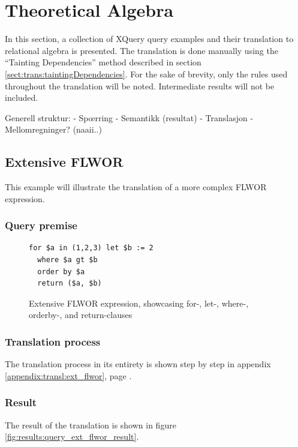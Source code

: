\section{Theoretical Algebra}
\label{sect:result:theoretical_algebra}
In this section, a collection of XQuery query examples and their translation to
relational algebra is presented. The translation is done manually using the
``Tainting Dependencies'' method described in section
\ref{sect:trans:taintingDependencies}. For the sake of brevity, only the
rules used throughout the translation will be noted. Intermediate results will
not be included.

Generell struktur:
- Sp\oe rring
- Semantikk (resultat)
- Translasjon
- Mellomregninger? (naaii..)

\subsection{Extensive FLWOR}
This example will illustrate the translation of a more complex FLWOR expression.

\subsubsection{Query premise}
\begin{figure}[!htp]
\begin{center}
\begin{Verbatim}
for $a in (1,2,3) let $b := 2
  where $a gt $b
  order by $a
  return ($a, $b)
\end{Verbatim}
  \caption{Extensive FLWOR expression, showcasing for-, let-, where-, orderby-,
  and return-clauses}
  \label{fig:results:query_ext_flwor}
\end{center}
\end{figure}

\subsubsection{Translation process}
The translation process in its entirety is shown step by step in appendix
\ref{appendix:transl:ext_flwor}, page \pageref{appendix:transl:ext_flwor}.

\subsubsection{Result}
The result of the translation is shown in figure
\ref{fig:results:query_ext_flwor_result}.

